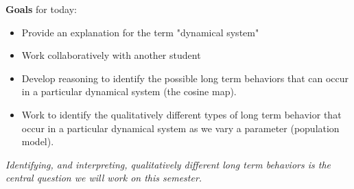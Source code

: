 \documentclass[12pt,letterpaper,noanswers]{exam}
\begin{document}
\vspace{0.5cm}

\noindent \textbf{Goals} for today:
\begin{itemize}
    \item Provide an explanation for the term "dynamical system"
    \item Work collaboratively with another student
    \item Develop reasoning to identify the possible long term behaviors that can occur in a particular dynamical system (the cosine map).  
    \item Work to identify the qualitatively different types of long term behavior that occur in a particular dynamical system as we vary a parameter (population model).
\end{itemize}

\emph{Identifying, and interpreting, qualitatively different long term behaviors is the central question we will work on this semester.}


\eject 
\end{document}
